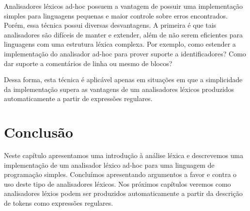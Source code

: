 Analisadores léxicos ad-hoc possuem a vantagem de possuir uma
implementação simples para linguagens pequenas e maior controle sobre
erros encontrados. Porém, essa técnica possui diversas desvantagens.
A primeira é que tais analisadores são difíceis de manter e extender,
além de não serem eficientes para linguagens com uma estrutura léxica
complexa. Por exemplo, como estender a implementação do analisador
ad-hoc para prover suporte a identificadores? Como dar suporte a
comentários de linha ou mesmo de blocos?

Dessa forma, esta técnica é aplicável apenas em situações em que a
simplicidade da implementação supera as vantagens de um analisadores
léxicos produzidos automaticamente a partir de expressões regulares.

\section{Conclusão}

Neste capítulo apresentamos uma introdução à análise léxica e
descrevemos uma implementação de um analisador léxico ad-hoc para uma
linguagem de programação simples. Concluímos apresentando argumentos
a favor e contra o uso deste tipo de analisadores léxicos. Nos
próximos capítulos veremos como analisadores léxios podem ser
produzidos automaticamente a partir da descrição de tokens como
expressões regulares.
